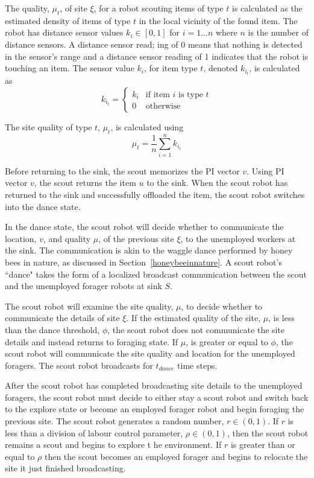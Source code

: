 The quality, $\mu_t$, of site $\xi$, for a robot scouting items of type $t$ is calculated as the estimated density of items of type $t$ in the local vicinity of the found item. The robot has distance sensor values $k_i\in[0,1]$ for $ i = 1...n$ where $n$ is the number of distance sensors. A distance sensor read;
ing of 0 means that nothing is detected in the sensor's range and a distance sensor reading of 1 indicates that the robot is touching an item. The sensor value $k_i$, for item type $t$, denoted $k_{i_t}$, is calculated as 
\begin{equation}
\label{densitytype}
k_{i_t}=
    \begin{cases}
      k_i & \text{if item $i$ is type $t$} \\
      0 & \text{otherwise}
    \end{cases}
\end{equation}

The site quality of type $t$, $\mu_t$, is calculated using
\begin{equation}
\label{density}
\mu_t = \frac{1}{n}\sum\limits_{i=1}^n k_{i_t}
\end{equation}
 
Before returning to the sink, the scout memorizes the PI vector $v$. Using PI vector $v$, the scout returns the item $u$ to the sink. When the scout robot has returned to the sink and successfully offloaded the item, the scout robot switches into the dance state.

In the dance state, the scout robot will decide whether to communicate the location, $v$, and quality $\mu$, of the previous site $\xi$, to the unemployed workers at the sink. The communication is akin to the waggle dance performed by honey bees in nature, as discussed in Section~\ref{honeybeeinnature}. A scout robot's ``dance" takes the form of a localized broadcast communication between the scout and the unemployed forager robots at sink $S$.

The scout robot will examine the site quality, $\mu$, to decide whether to communicate the details of site $\xi$. If the estimated quality of the site, $\mu$, is less than the dance threshold, $\phi$, the scout robot does not communicate the site details and instead returns to foraging state. If $\mu$, is greater or equal to $\phi$, the scout robot will communicate the site quality and location for the unemployed foragers. The scout robot broadcasts for $t_{dance}$ time steps.

After the scout robot has completed broadcasting site details to the unemployed foragers, the scout robot must decide to either stay a scout robot and switch back to the explore state or become an employed forager robot and begin foraging the previous site. The scout robot generates a random number, $r\in(0,1)$. If $r$ is less than a division of labour control parameter, $\rho\in(0,1)$, then the scout robot remains a scout and begins to explore t he environment. If $r$ is greater than or equal to $\rho$ then the scout becomes an employed forager and begins to relocate the site it just finished broadcasting.

